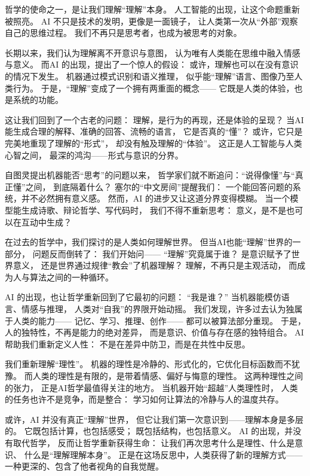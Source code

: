 哲学的使命之一，是让我们理解“理解”本身。  
人工智能的出现，让这个命题重新被照亮。  
AI 不只是技术的发明，更像是一面镜子，  
让人类第一次从“外部”观察自己的思维过程。  
我们不再只是思考者，也成为被思考的对象。

长期以来，我们认为理解离不开意识与意图，  
认为唯有人类能在思维中融入情感与意义。  
而AI 的出现，提出了一个惊人的假设：  
或许，理解也可以在没有意识的情况下发生。  
机器通过模式识别和语义推理，  
似乎能“理解”语言、图像乃至人类行为。  
于是，“理解”变成了一个拥有两重面的概念——  
它既是人类的体验，也是系统的功能。

这让我们回到了一个古老的问题：  
理解，是行为的再现，还是体验的呈现？  
当AI 能生成合理的解释、准确的回答、流畅的语言，  
它是否真的“懂”？  
或许，它只是完美地重现了理解的“形式”，  
却没有触及理解的“体验”。  
这正是人工智能与人类心智之间，  
最深的鸿沟——形式与意识的分界。

自图灵提出机器能否“思考”的问题以来，  
哲学家们就不断追问：“说得像懂”与“真正懂”之间，  
到底隔着什么？  
塞尔的“中文房间”提醒我们：  
一个能回答问题的系统，并不必然拥有意义感。  
然而，AI 的进步又让这道分界变得模糊。  
当一个模型能生成诗歌、辩论哲学、写代码时，  
我们不得不重新思考：  
意义，是不是也可以在互动中生成？

在过去的哲学中，我们探讨的是人类如何理解世界。  
但当AI也能“理解”世界的一部分，  
问题反而倒转了：  
我们开始问——  
“理解”究竟属于谁？  
是意识赋予了世界意义，  
还是世界通过规律“教会”了机器理解？  
理解，不再只是主观活动，  
而成为人与算法之间的一种循环。

AI 的出现，也让哲学重新回到了它最初的问题：  
“我是谁？”  
当机器能模仿语言、情感与推理，  
人类对“自我”的界限开始动摇。  
我们发现，许多过去认为独属于人类的能力——  
记忆、学习、推理、创作——  
都可以被算法部分重现。  
于是，人的独特性，不再是能力的绝对差异，  
而是意识、价值与存在感的独特组合。  
AI 帮助我们重新定义人性：  
不是在差异中防卫，而是在共性中反思。

我们重新理解“理性”。  
机器的理性是冷静的、形式化的，它优化目标函数而不犹豫。  
而人类的理性是有限的，是带着情感、偏好与悔意的理性。  
这两种理性之间的张力，  
正是AI哲学最值得关注的地方。  
当机器开始“超越”人类理性时，  
人类的任务也许不是竞争，而是整合：  
学习如何让算法的冷静与人的温度共存。

或许，AI 并没有真正“理解”世界，  
但它让我们第一次意识到——理解本身是多层的。  
它既包括计算，也包括感受；  
既包括结构，也包括意义。  
AI 的出现，并没有取代哲学，  
反而让哲学重新获得生命：  
让我们再次思考什么是理性、什么是意识、  
什么是“理解理解本身”。  
正是在这场反思中，人类获得了新的理解方式——  
一种更深的、包含了他者视角的自我觉醒。

